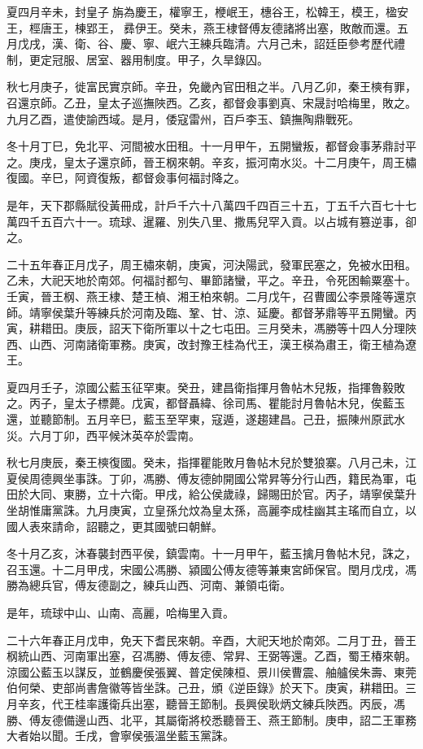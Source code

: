 \begin{pinyinscope}
夏四月辛未，封皇子旃為慶王，權寧王，楩岷王，橞谷王，松韓王，模王，楹安王，桱唐王，棟郢王，彞伊王。癸未，燕王棣督傅友德諸將出塞，敗敵而還。五月戊戌，漢、衛、谷、慶、寧、岷六王練兵臨清。六月己未，詔廷臣參考歷代禮制，更定冠服、居室、器用制度。甲子，久旱錄囚。

秋七月庚子，徙富民實京師。辛丑，免畿內官田租之半。八月乙卯，秦王樉有罪，召還京師。乙丑，皇太子巡撫陜西。乙亥，都督僉事劉真、宋晟討哈梅里，敗之。九月乙酉，遣使諭西域。是月，倭寇雷州，百戶李玉、鎮撫陶鼎戰死。

冬十月丁巳，免北平、河間被水田租。十一月甲午，五開蠻叛，都督僉事茅鼎討平之。庚戌，皇太子還京師，晉王㭎來朝。辛亥，振河南水災。十二月庚午，周王橚復國。辛巳，阿資復叛，都督僉事何福討降之。

是年，天下郡縣賦役黃冊成，計戶千六十八萬四千四百三十五，丁五千六百七十七萬四千五百六十一。琉球、暹羅、別失八里、撒馬兒罕入貢。以占城有篡逆事，卻之。

二十五年春正月戊子，周王橚來朝，庚寅，河決陽武，發軍民塞之，免被水田租。乙未，大祀天地於南郊。何福討都勻、畢節諸蠻，平之。辛丑，令死困輸粟塞十。壬寅，晉王㭎、燕王棣、楚王楨、湘王柏來朝。二月戊午，召曹國公李景隆等還京師。靖寧侯葉升等練兵於河南及臨、鞏、甘、涼、延慶。都督茅鼎等平五開蠻。丙寅，耕耤田。庚辰，詔天下衛所軍以十之七屯田。三月癸未，馮勝等十四人分理陜西、山西、河南諸衛軍務。庚寅，改封豫王桂為代王，漢王楧為肅王，衛王植為遼王。

夏四月壬子，涼國公藍玉征罕東。癸丑，建昌衛指揮月魯帖木兒叛，指揮魯毅敗之。丙子，皇太子標薨。戊寅，都督聶緯、徐司馬、瞿能討月魯帖木兒，俟藍玉還，並聽節制。五月辛巳，藍玉至罕東，寇遁，遂趨建昌。己丑，振陳州原武水災。六月丁卯，西平候沐英卒於雲南。

秋七月庚辰，秦王樉復國。癸未，指揮瞿能敗月魯帖木兒於雙狼寨。八月己未，江夏侯周德興坐事誅。丁卯，馮勝、傅友德帥開國公常昇等分行山西，籍民為軍，屯田於大同、東勝，立十六衛。甲戌，給公侯歲祿，歸賜田於官。丙子，靖寧侯葉升坐胡惟庸黨誅。九月庚寅，立皇孫允炆為皇太孫，高麗李成桂幽其主瑤而自立，以國人表來請命，詔聽之，更其國號曰朝鮮。

冬十月乙亥，沐春襲封西平侯，鎮雲南。十一月甲午，藍玉擒月魯帖木兒，誅之，召玉還。十二月甲戌，宋國公馮勝、潁國公傅友德等兼東宮師保官。閏月戊戌，馮勝為總兵官，傅友德副之，練兵山西、河南、兼領屯衛。

是年，琉球中山、山南、高麗，哈梅里入貢。

二十六年春正月戊申，免天下耆民來朝。辛酉，大祀天地於南郊。二月丁丑，晉王㭎統山西、河南軍出塞，召馮勝、傅友德、常昇、王弼等還。乙酉，蜀王椿來朝。涼國公藍玉以謀反，並鶴慶侯張翼、普定侯陳桓、景川侯曹震、舳艫侯朱壽、東莞伯何榮、吏部尚書詹徽等皆坐誅。己丑，頒《逆臣錄》於天下。庚寅，耕耤田。三月辛亥，代王桂率護衛兵出塞，聽晉王節制。長興侯耿炳文練兵陜西。丙辰，馮勝、傅友德備邊山西、北平，其屬衛將校悉聽晉王、燕王節制。庚申，詔二王軍務大者始以聞。壬戌，會寧侯張溫坐藍玉黨誅。


\end{pinyinscope}
